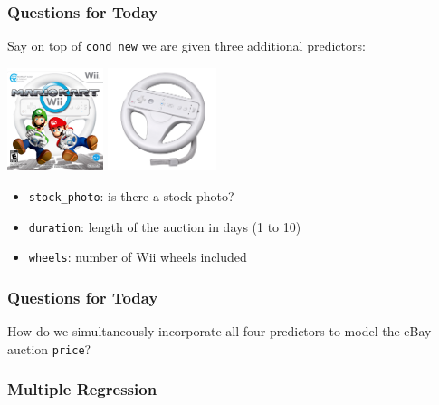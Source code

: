 \documentclass[handout]{beamer}
\newcommand{\blue}[1]{\textcolor{blue2}{#1}}
\begin{document}
\begin{frame}[fragile]
\frametitle{Questions for Today}


Say on top of {\tt cond\_new} we are given three additional predictors:
\begin{center}
\includegraphics[height=3cm]{figure/mario_kart_action.png}
\includegraphics[height=3cm]{figure/wheel.png}
\end{center}
\pause

\begin{itemize}
\item {\tt stock\_photo}: is there a stock photo?
\item {\tt duration}: length of the auction in days (1 to 10)
\item {\tt wheels}: number of Wii wheels included
\end{itemize}


\end{frame}


\begin{frame}[fragile]
\frametitle{Questions for Today}

How do we simultaneously incorporate all four predictors to model the eBay auction {\tt price}?

\end{frame}


\begin{frame}[fragile]
\frametitle{Multiple Regression}
\end{frame}
\end{document}
